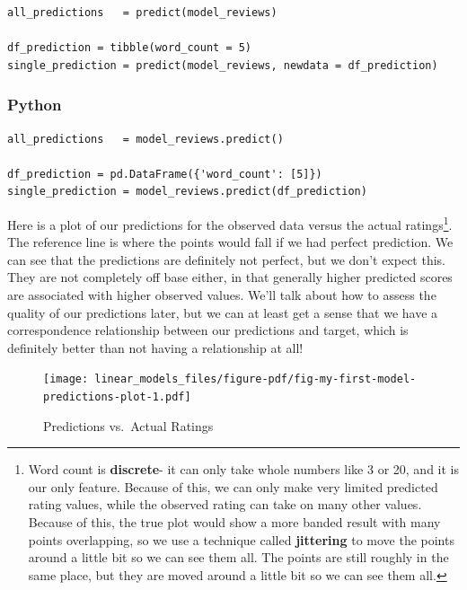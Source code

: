 \documentclass[
  letterpaper,
]{krantz}
\begin{document}
\begin{verbatim}
all_predictions   = predict(model_reviews)

df_prediction = tibble(word_count = 5)
single_prediction = predict(model_reviews, newdata = df_prediction)
\end{verbatim}

\subsubsection{Python}

\begin{verbatim}
all_predictions   = model_reviews.predict()

df_prediction = pd.DataFrame({'word_count': [5]})
single_prediction = model_reviews.predict(df_prediction)
\end{verbatim}

Here is a plot of our predictions for the observed data versus the
actual ratings\footnote{Word count is \textbf{discrete}- it can only
  take whole numbers like 3 or 20, and it is our only feature. Because
  of this, we can only make very limited predicted rating values, while
  the observed rating can take on many other values. Because of this,
  the true plot would show a more banded result with many points
  overlapping, so we use a technique called \textbf{jittering} to move
  the points around a little bit so we can see them all. The points are
  still roughly in the same place, but they are moved around a little
  bit so we can see them all.}. The reference line is where the points
would fall if we had perfect prediction. We can see that the predictions
are definitely not perfect, but we don't expect this. They are not
completely off base either, in that generally higher predicted scores
are associated with higher observed values. We'll talk about how to
assess the quality of our predictions later, but we can at least get a
sense that we have a correspondence relationship between our predictions
and target, which is definitely better than not having a relationship at
all!

\begin{figure}

{\centering \texttt{[image: linear\_models\_files/figure-pdf/fig-my-first-model-predictions-plot-1.pdf]}

}

\caption{\label{fig-my-first-model-predictions-plot}Predictions
vs.~Actual Ratings}

\end{figure}
\end{document}
